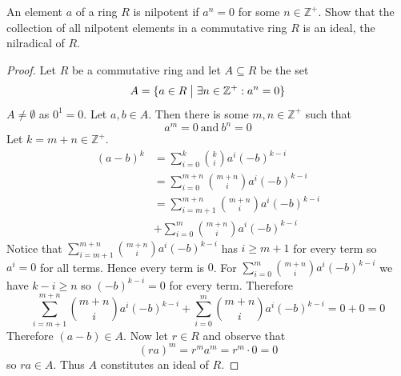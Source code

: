 \begin{prob}
    An element $a$ of a ring $R$ is nilpotent if $a^n = 0$ for some 
    $n \in \mathbb Z^+$. Show that the collection of all nilpotent 
    elements in a commutative ring $R$ is an ideal, the nilradical 
    of $R$.
\end{prob}
\begin{proof}
    Let $R$ be a commutative ring and let $A \subseteq R$ be the 
    set 
    \[
        A = \{a \in R \bigm| \exists n \in \mathbb Z^+ : a^n = 0\}
    \]
    $A \neq \emptyset$ as $0^1 = 0$. Let $a,b \in A$. Then there 
    is some $m,n \in \mathbb Z^+$ such that 
    \[
        a^m = 0 \ \text{and} \ b^n = 0
    \]
    Let $k = m + n \in \mathbb Z^+$. 
    \begin{align*}
        (a-b)^k 
        &= \displaystyle\sum_{i=0}^{k}\binom{k}{i}a^i(-b)^{k-i}\\
        &= \displaystyle\sum_{i=0}^{m+n}\binom{m+n}{i}a^i(-b)^{k-i}\\
        &= \displaystyle\sum_{i=m+1}^{m+n}\binom{m+n}{i}a^i(-b)^{k-i}
        \\
        &+ \displaystyle\sum_{i=0}^{m}\binom{m+n}{i}a^{i}(-b)^{k-i}
    \end{align*}
    Notice that $\sum_{i=m+1}^{m+n}\binom{m+n}{i}a^i(-b)^{k-i}$ has 
    $i \geq m + 1$ for every term so $a^i = 0$ for all terms. 
    Hence every term is $0$. 
    For $\sum_{i=0}^{m}\binom{m+n}{i}a^i(-b)^{k-i}$ we have 
    $k-i \geq n$ so $(-b)^{k-i} = 0$ for every term. 
    Therefore 
    \[
        \displaystyle\sum_{i=m+1}^{m+n}\binom{m+n}{i}a^i(-b)^{k-i} 
        + \displaystyle\sum_{i=0}^{m}\binom{m+n}{i}a^i(-b)^{k-i} 
        = 0 + 0 = 0
    \]
    Therefore $(a-b) \in A$. 
    Now let $r \in R$ and observe that 
    \[
        (ra)^m = r^ma^m = r^m \cdot 0 = 0 
    \]
    so $ra \in A$. Thus $A$ constitutes an ideal of $R$.
\end{proof}

